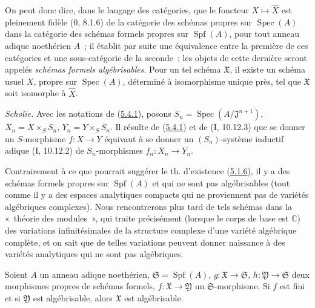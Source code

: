 On peut donc dire, dans le langage des catégories, que le foncteur
$X\mapsto\widehat X$ est pleinement fidèle ($0$, 8.1.6) de la catégorie des
schémas propres sur $\operatorname{Spec}(A)$ dans la catégorie des schémas formels
propres sur $\operatorname{Spf}(A)$, pour tout anneau adique noethérien $A$~; il
établit par suite une équivalence entre la première de ces catégories et une
sous-catégorie de la seconde~; les objets de cette dernière seront appelés
\emph{schémas formels algébrisables}. Pour un tel schéma $\mathfrak X$, il existe
un schéma usuel $X$, propre sur $\operatorname{Spec}(A)$, déterminé à isomorphisme
unique près, tel que $\mathfrak X$ soit isomorphe à $\widehat X$.

\begin{env}[5.4.2]
\label{III.5.4.2-fr}
\emph{Scholie.}
Avec les notations de (\hyperref[III.5.4.1-fr]{5.4.1}), posons
$S_n=\operatorname{Spec}(A/\mathfrak J^{n+1})$,
$X_n=X\times_S S_n$, $Y_n=Y\times_S S_n$. Il résulte de
(\hyperref[III.5.4.1-fr]{5.4.1}) et de (I, 10.12.3) que se donner un
$S$-morphisme $f:X\to Y$ équivaut à se donner un $(S_n)$-système inductif adique
(I, 10.12.2) de $S_n$-morphismes $f_n:X_n\to Y_n$.
\end{env}

\begin{remark}[5.4.3]
\label{III.5.4.3-fr}
Contrairement à ce que pourrait suggérer le th. d'existence
(\hyperref[III.5.1.6-fr]{5.1.6}), il y a des schémas formels propres sur
$\operatorname{Spf}(A)$ et qui ne sont pas algébrisables (tout comme il y a des
espaces analytiques compacts qui ne proviennent pas de variétés algébriques
complexes). Nous rencontrerons plus tard de tels schémas dans la «~théorie des
modules~», qui traite précisément (lorsque le corps de base est $\mathbb C$) des
variations infinitésimales de la structure complexe d'une variété algébrique
complète, et on sait que de telles variations peuvent donner naissance à des
variétés analytiques qui ne sont pas algébriques.
\end{remark}

\begin{proposition}[5.4.4]
\label{III.5.4.4-fr}
Soient $A$ un anneau adique noethérien, $\mathfrak S=\operatorname{Spf}(A)$,
$g:\mathfrak X\to\mathfrak S$, $h:\mathfrak Y\to\mathfrak S$ deux morphismes
propres de schémas formels, $f:\mathfrak X\to\mathfrak Y$ un
$\mathfrak S$-morphisme. Si $f$ est fini et si $\mathfrak Y$ est algébrisable,
alors $\mathfrak X$ est algébrisable.
\end{proposition}

